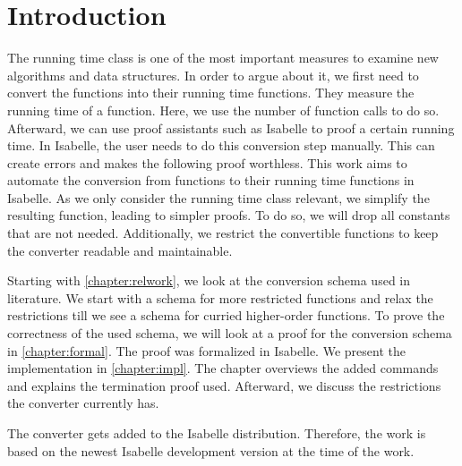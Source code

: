 \chapter{Introduction}\label{chapter:introduction}

The running time class is one of the most important measures to examine new algorithms and data structures.
In order to argue about it, we first need to convert the functions into their running time functions.
They measure the running time of a function.
Here, we use the number of function calls to do so.
Afterward, we can use proof assistants such as Isabelle to proof a certain running time.
In Isabelle, the user needs to do this conversion step manually.
This can create errors and makes the following proof worthless.
This work aims to automate the conversion from functions to their running time functions in Isabelle.
As we only consider the running time class relevant, we simplify the resulting function, leading to simpler proofs.
To do so, we will drop all constants that are not needed.
Additionally, we restrict the convertible functions to keep the converter readable and maintainable.

Starting with \autoref{chapter:relwork}, we look at the conversion schema used in literature.
We start with a schema for more restricted functions and relax the restrictions till we see a schema for curried higher-order functions.
To prove the correctness of the used schema, we will look at a proof for the conversion schema in \autoref{chapter:formal}.
The proof was formalized in Isabelle.
We present the implementation in \autoref{chapter:impl}.
The chapter overviews the added commands and explains the termination proof used.
Afterward, we discuss the restrictions the converter currently has.

The converter gets added to the Isabelle distribution.
Therefore, the work is based on the newest Isabelle development version at the time of the work.
